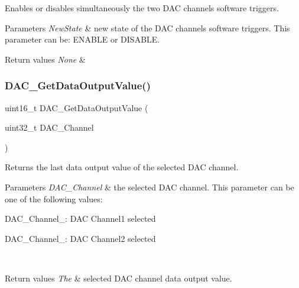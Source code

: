 Enables or disables simultaneously the two D\+AC channels software triggers. 


\begin{DoxyParams}{Parameters}
{\em New\+State} & new state of the D\+AC channels software triggers. This parameter can be\+: E\+N\+A\+B\+LE or D\+I\+S\+A\+B\+LE. \\
\hline
\end{DoxyParams}

\begin{DoxyRetVals}{Return values}
{\em None} & \\
\hline
\end{DoxyRetVals}
\mbox{\label{group___d_a_c___private___functions_ga51274838de1e5dd012a82d7f44d7a50b}} 
\subsubsection{\texorpdfstring{DAC\_GetDataOutputValue()}{DAC\_GetDataOutputValue()}}
{\footnotesize\ttfamily uint16\+\_\+t D\+A\+C\+\_\+\+Get\+Data\+Output\+Value (\begin{DoxyParamCaption}\item[{uint32\+\_\+t}]{D\+A\+C\+\_\+\+Channel }\end{DoxyParamCaption})}



Returns the last data output value of the selected D\+AC channel. 


\begin{DoxyParams}{Parameters}
{\em D\+A\+C\+\_\+\+Channel} & the selected D\+AC channel. This parameter can be one of the following values\+: \begin{DoxyItemize}
\item D\+A\+C\+\_\+\+Channel\+\_\+: D\+AC Channel1 selected \item D\+A\+C\+\_\+\+Channel\+\_\+: D\+AC Channel2 selected \end{DoxyItemize}
\\
\hline
\end{DoxyParams}

\begin{DoxyRetVals}{Return values}
{\em The} & selected D\+AC channel data output value. \\
\hline
\end{DoxyRetVals}
\mbox{\label{group___d_a_c___private___functions_ga7c59850468ed4bf0659663fe495441da}} 
